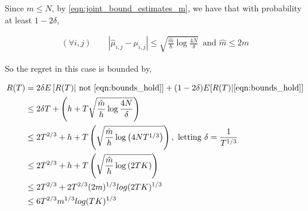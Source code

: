 \documentclass{article}
\newcommand{\eqn}[1]{\begin{align}#1\end{align}}
\newcommand{\eq}[1]{\begin{align*}#1\end{align*}}
\theoremstyle{plain}
\theoremstyle{definition}
\begin{document}
Since $m \leq N$, by \cref{eqn:joint_bound_estimates_m}, we have that with probability at least $1-2\delta$, 

\eqn{
\label{eqn:bounds_hold}
(\forall i, j) \qquad \left|\hat \mu_{i,j} - \mu_{i,j}\right| \leq \sqrt{\frac{\hat m}{h} \log\frac{4N}{\delta}}\, \text { and } \hat{m} \leq 2m
}


So the regret in this case is bounded by,

\eq {
R(T) & =  2\delta E\left[R(T)|\text{ not } \cref{eqn:bounds_hold}\right] + (1-2\delta)E[R(T)| \cref{eqn:bounds_hold}]  \\
& \leq 2\delta T + \left(h + T\sqrt{\frac{\hat m}{h} \log\frac{4N}{\delta}} \right)\\
 &  \leq 2T^{2/3}  + h + T \left( \sqrt{\frac{\hat m}{h} \log \left(4NT^{1/3}\right)}\right), \text { letting } \delta = \frac{1}{T^{1/3}} \\
&  \leq 2T^{2/3} + h + T \left( \sqrt{\frac{\hat m}{h} \log \left(2TK\right)}\right) \\
&  \leq 2T^{2/3}  + 2T^{2/3}(2m)^{1/3}log(2TK)^{1/3}  \\
&  \leq 6T^{2/3}m^{1/3}log(TK)^{1/3}  \\
}
\end{document}
